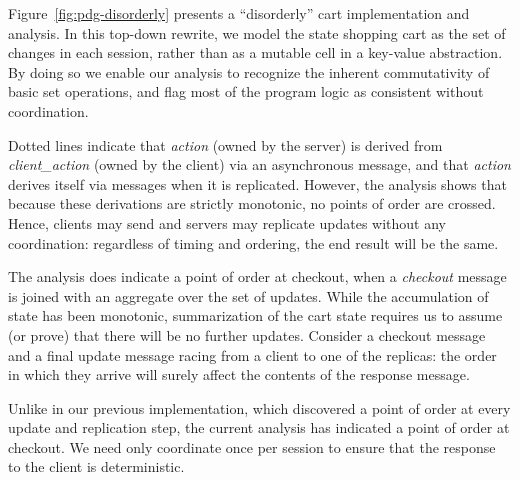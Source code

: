 Figure~\ref{fig:pdg-disorderly} presents a ``disorderly'' cart implementation
and analysis.  In this top-down rewrite, we model the state shopping cart 
as the set of changes in each session, rather than as a mutable cell in a
key-value abstraction.  By doing so we enable our analysis to recognize the
inherent commutativity of basic set operations, and flag most of the 
program logic as consistent without coordination.

Dotted lines indicate that 
\emph{action} (owned by the server) is derived from \emph{client\_action} 
(owned by the client) via an asynchronous message, and that \emph{action} 
derives itself via messages when it is replicated.  However, the analysis
shows that because these derivations are strictly monotonic, no points of
order are crossed.  Hence, clients may send and servers may replicate 
updates without any coordination: regardless of timing and ordering, the end
result will be the same.

The analysis does indicate a point of order at checkout, when a \emph{checkout}
message is joined with an aggregate over the set of updates.  While the 
accumulation of state has been monotonic, summarization of the cart state
requires us to assume (or prove) that there will be no further updates.
Consider a checkout message and a final update message racing from a client
to one of the replicas: the order in which they arrive will surely affect
the contents of the response message.  

Unlike in our previous implementation, which discovered a point of order at
every update and replication step, the current analysis has indicated
a point of order at checkout.  We need only coordinate once per session to
ensure that the response to the client is deterministic.


